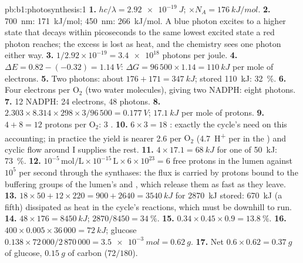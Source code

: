 \begin{solution}{pb:b1:photosynthesis:1}
\textbf{1.} $hc/\lambda = \qty{2.92e-19}{J}$; $\times N_A = \qty{176}{kJ/mol}$.
\textbf{2.} \qty{700}{nm}: \qty{171}{kJ/mol}; \qty{450}{nm}:
\qty{266}{kJ/mol}. A blue photon excites  to a higher state
that decays within picoseconds to the same lowest excited state a red
photon reaches; the excess is lost as heat, and the chemistry sees one
photon either way.
\textbf{3.} $1/2.92\times 10^{-19} = \num{3.4e18}$ photons per joule.
\textbf{4.} $\Delta E = 0.82 - (-0.32) = \qty{1.14}{V}$: $\Delta G =
96\,500\times 1.14 = \qty{110}{kJ}$ per mole of electrons.
\textbf{5.} Two photons: about $176 + 171 = \qty{347}{kJ}$; stored
\qty{110}{kJ}: \qty{32}{\%}.
\textbf{6.} Four electrons per $\mathrm{O_2}$ (two water molecules),
giving two NADPH: eight photons.
\textbf{7.} 12 NADPH: 24 electrons, 48 photons.
\textbf{8.} $2.303\times 8.314\times 298\times 3/96\,500 = \qty{0.177}{V}$;
$\qty{17.1}{kJ}$ per mole of protons.
\textbf{9.} $4 + 8 = 12$ protons per $\mathrm{O_2}$: 3 .
\textbf{10.} $6\times 3 = 18$ : exactly the cycle's need on this
accounting; in practice the yield is nearer 2.6 per $\mathrm{O_2}$
(\qty{4.7}{H^+} per  in the ) and cyclic flow around
 I supplies the rest.
\textbf{11.} $4\times 17.1 = \qty{68}{kJ}$ for one  of \qty{50}{kJ}:
\qty{73}{\%}.
\textbf{12.} $10^{-5}\,\mathrm{mol/L}\times 10^{-15}\,\mathrm{L}\times
6\times 10^{23} = 6$ free protons in the lumen against $10^5$ per second
through the synthases: the flux is carried by protons bound to the
buffering groups of the lumen's  and , which release them
as fast as they leave.
\textbf{13.} $18\times 50 + 12\times 220 = 900 + 2640 = \qty{3540}{kJ}$
for \qty{2870}{kJ} stored: \qty{670}{kJ} (a fifth) dissipated as heat in
the cycle's reactions, which must be downhill to run.
\textbf{14.} $48\times 176 = \qty{8450}{kJ}$; $2870/8450 = \qty{34}{\%}$.
\textbf{15.} $0.34\times 0.45\times 0.9 = \qty{13.8}{\%}$.
\textbf{16.} $400\times 0.005\times 36\,000 = \qty{72}{kJ}$; glucose
$0.138\times 72\,000/2\,870\,000 = \qty{3.5e-3}{mol} = \qty{0.62}{g}$.
\textbf{17.} Net $0.6\times 0.62 = \qty{0.37}{g}$ of glucose,
$\qty{0.15}{g}$ of carbon ($72/180$).

\end{solution}
